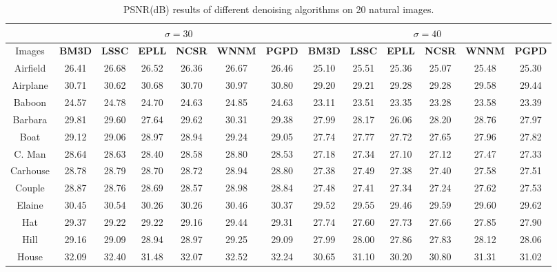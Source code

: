 \begin{table}[t!]
\begin{adjustwidth}{-0.2cm}{}
\caption{PSNR(dB) results of different denoising algorithms on 20 natural images.}
\label{tab2-3}
\begin{center}
\renewcommand\arraystretch{1.0}
\scriptsize
\begin{tabular}{|c||c|c|c|c|c|c||c|c|c|c|c|c|}
\hline
&\multicolumn{6}{c||}{ $\sigma = 30$}&\multicolumn{6}{c|}{ $\sigma = 40$}
\\
\hline
\hline
Images&\textbf{BM3D}&\textbf{LSSC}&\textbf{EPLL}&\textbf{NCSR}&\textbf{WNNM}&\textbf{PGPD}
&\textbf{BM3D}&\textbf{LSSC}&\textbf{EPLL}&\textbf{NCSR}&\textbf{WNNM}&\textbf{PGPD} 
\\
\hline
Airfield& 26.41 & 26.68 & 26.52  &  26.36  & 26.67 & 26.46     & 25.10 &  25.51  & 25.36 & 25.07 & 25.48 & 25.30 
\\
\hline
Airplane&  30.71  & 30.62  &  30.68  &  30.70 & 30.97 & 30.80    & 29.20 & 29.21  & 29.28 & 29.28 & 29.58 & 29.44
\\
\hline
 Baboon & 24.57   & 24.78  & 24.70   & 24.63  & 24.85 & 24.63   &  23.11 &  23.51  & 23.35 & 23.28 & 23.58 & 23.39   
\\
\hline 
 Barbara & 29.81  & 29.60 & 27.64 & 29.62 & 30.31 & 29.38   &  27.99 & 28.17 & 26.06 & 28.20 & 28.76 & 27.97
\\
\hline
 Boat & 29.12  & 29.06  & 28.97 & 28.94 & 29.24 &  29.05   &  27.74& 27.77  &  27.72 & 27.65 &27.96  & 27.82    
\\
\hline
 C. Man& 28.64 & 28.63 & 28.40  & 28.58 & 28.80& 28.53     & 27.18& 27.34  & 27.10 &27.12  &27.47 & 27.33
\\
\hline
 Carhouse& 28.78 & 28.79   & 28.70    & 28.72 & 28.94 & 28.80   & 27.38 &  27.49 & 27.38 & 27.40 & 27.58 & 27.51
\\
\hline
 Couple & 28.87  & 28.76  & 28.69 & 28.57 & 28.98 & 28.84    & 27.48 & 27.41 &  27.34  & 27.24 & 27.62 & 27.53   
\\
\hline
 Elaine& 30.45 & 30.54 & 30.26   &  30.26  & 30.46 & 30.37    &29.52 & 29.55 & 29.46 & 29.59 & 29.60 &29.62   
\\
\hline
 Hat& 29.37 & 29.22  & 29.22   &  29.16  & 29.44  &29.31    & 27.74 & 27.60 &  27.73  &  27.66 & 27.85  &27.90   
\\
\hline
 Hill & 29.16 & 29.09 & 28.94 & 28.97 & 29.25 & 29.09    & 27.99 & 28.00 & 27.86 & 27.83 & 28.12 & 28.06 
\\
\hline
 House& 32.09 & 32.40  & 31.48  & 32.07 & 32.52 & 32.24    & 30.65  & 31.10 & 30.20 & 30.80  & 31.31 &31.02    

\end{tabular}
\end{center}
\end{adjustwidth}
\end{table}
